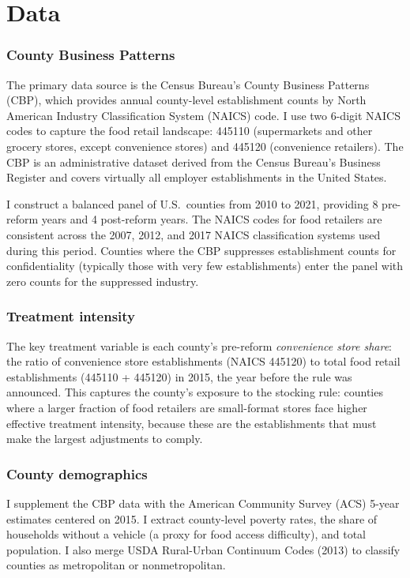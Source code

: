 \documentclass[12pt]{article}
\begin{document}
\section{Data}
\label{sec:data}

\subsubsection*{County Business Patterns} The primary data source is the Census Bureau's County Business Patterns (CBP), which provides annual county-level establishment counts by North American Industry Classification System (NAICS) code. I use two 6-digit NAICS codes to capture the food retail landscape: 445110 (supermarkets and other grocery stores, except convenience stores) and 445120 (convenience retailers). The CBP is an administrative dataset derived from the Census Bureau's Business Register and covers virtually all employer establishments in the United States.

I construct a balanced panel of U.S.\ counties from 2010 to 2021, providing 8 pre-reform years and 4 post-reform years. The NAICS codes for food retailers are consistent across the 2007, 2012, and 2017 NAICS classification systems used during this period. Counties where the CBP suppresses establishment counts for confidentiality (typically those with very few establishments) enter the panel with zero counts for the suppressed industry.

\subsubsection*{Treatment intensity} The key treatment variable is each county's pre-reform \textit{convenience store share}: the ratio of convenience store establishments (NAICS 445120) to total food retail establishments (445110 + 445120) in 2015, the year before the rule was announced. This captures the county's exposure to the stocking rule: counties where a larger fraction of food retailers are small-format stores face higher effective treatment intensity, because these are the establishments that must make the largest adjustments to comply.

\subsubsection*{County demographics} I supplement the CBP data with the American Community Survey (ACS) 5-year estimates centered on 2015. I extract county-level poverty rates, the share of households without a vehicle (a proxy for food access difficulty), and total population. I also merge USDA Rural-Urban Continuum Codes (2013) to classify counties as metropolitan or nonmetropolitan.
\end{document}
